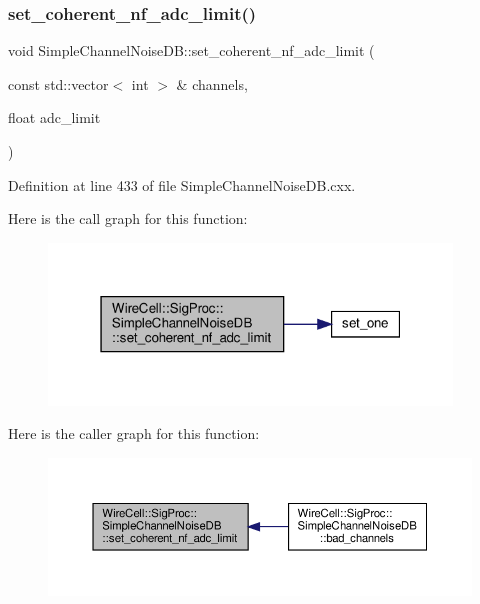 \subsubsection{\texorpdfstring{set\+\_\+coherent\+\_\+nf\+\_\+adc\+\_\+limit()}{set\_coherent\_nf\_adc\_limit()}}
{\footnotesize\ttfamily void Simple\+Channel\+Noise\+D\+B\+::set\+\_\+coherent\+\_\+nf\+\_\+adc\+\_\+limit (\begin{DoxyParamCaption}\item[{const std\+::vector$<$ int $>$ \&}]{channels,  }\item[{float}]{adc\+\_\+limit }\end{DoxyParamCaption})}



Definition at line 433 of file Simple\+Channel\+Noise\+D\+B.\+cxx.

Here is the call graph for this function\+:
\nopagebreak
\begin{figure}[H]
\begin{center}
\leavevmode
\includegraphics[width=304pt]{class_wire_cell_1_1_sig_proc_1_1_simple_channel_noise_d_b_a33d9cbe6648bda8c2a0d05fca376f461_cgraph}
\end{center}
\end{figure}
Here is the caller graph for this function\+:
\nopagebreak
\begin{figure}[H]
\begin{center}
\leavevmode
\includegraphics[width=350pt]{class_wire_cell_1_1_sig_proc_1_1_simple_channel_noise_d_b_a33d9cbe6648bda8c2a0d05fca376f461_icgraph}
\end{center}
\end{figure}
\mbox{\label{class_wire_cell_1_1_sig_proc_1_1_simple_channel_noise_d_b_aa8e97e9e59e9a91d23b572acd6eec29b}} 
